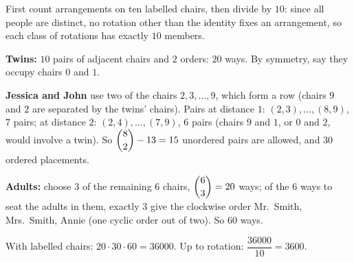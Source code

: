 First count arrangements on ten labelled chairs, then divide by $10$: since all people are distinct, no rotation other than the identity fixes an arrangement, so each class of rotations has exactly $10$ members.

\textbf{Twins:} $10$ pairs of adjacent chairs and $2$ orders: $20$ ways. By symmetry, say they occupy chairs $0$ and $1$.

\textbf{Jessica and John} use two of the chairs $2,3,\dots,9$, which form a row (chairs $9$ and $2$ are separated by the twins' chairs). Pairs at distance $1$: $(2,3),\dots,(8,9)$, $7$ pairs; at distance $2$: $(2,4),\dots,(7,9)$, $6$ pairs (chairs $9$ and $1$, or $0$ and $2$, would involve a twin). So $\dbinom82-13=15$ unordered pairs are allowed, and $30$ ordered placements.

\textbf{Adults:} choose $3$ of the remaining $6$ chairs, $\dbinom63=20$ ways; of the $6$ ways to seat the adults in them, exactly $3$ give the clockwise order Mr.\ Smith, Mrs.\ Smith, Annie (one cyclic order out of two). So $60$ ways.

With labelled chairs: $20\cdot30\cdot60=36000$. Up to rotation: $\dfrac{36000}{10}=\boxed{3600}$.
